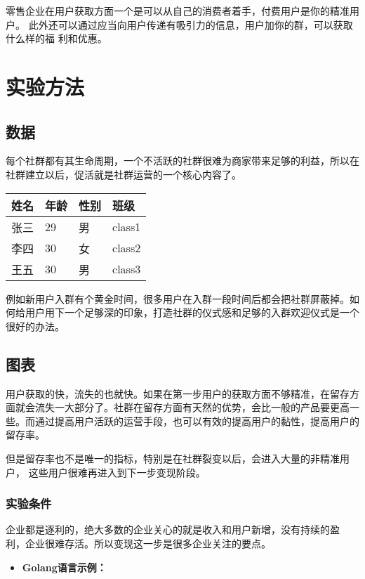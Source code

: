 \documentclass{article}
\begin{document}
    零售企业在用户获取方面一个是可以从自己的消费者着手，付费用户是你的精准用户。
    此外还可以通过应当向用户传递有吸引力的信息，用户加你的群，可以获取什么样的福
    利和优惠。

    \section{实验方法}

    \subsection{数据}
    每个社群都有其生命周期，一个不活跃的社群很难为商家带来足够的利益，所以在
    社群建立以后，促活就是社群运营的一个核心内容了。

    \begin{tabular}{|l|l|l|l|}
        \hline
        \rowcolor[HTML]{EFEFEF}
        姓名 & 年龄 & 性别 & 班级     \\ \hline
        张三 & 29 & 男  & class1 \\ \hline
        李四 & 30 & 女  & class2 \\ \hline
        王五 & 30 & 男  & class3 \\ \hline
    \end{tabular}

    例如新用户入群有个黄金时间，很多用户在入群一段时间后都会把社群屏蔽掉。如
    何给用户用下一个足够深的印象，打造社群的仪式感和足够的入群欢迎仪式是一个
    很好的办法。

    \subsection{图表}
    用户获取的快，流失的也就快。如果在第一步用户的获取方面不够精准，在留存方
    面就会流失一大部分了。社群在留存方面有天然的优势，会比一般的产品要更高一
    些。而通过提高用户活跃的运营手段，也可以有效的提高用户的黏性，提高用户的
    留存率。

    但是留存率也不是唯一的指标，特别是在社群裂变以后，会进入大量的非精准用户，
    这些用户很难再进入到下一步变现阶段。

    \subsubsection{实验条件}
    企业都是逐利的，绝大多数的企业关心的就是收入和用户新增，没有持续的盈
    利，企业很难存活。所以变现这一步是很多企业关注的要点。

    \begin{itemize}
        \item{\bfseries Golang语言示例：}
    \end{itemize}
\end{document}
